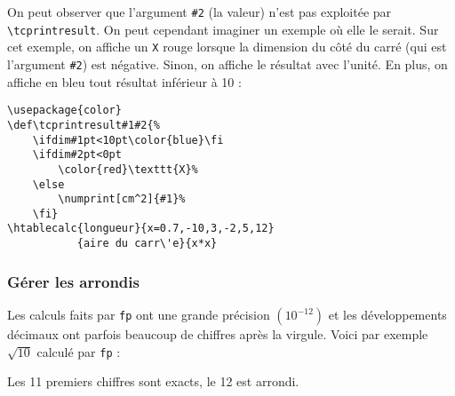 \documentclass[a4paper,10pt]{article}
\newcommand\verbinline{\lstinline[breaklines=false,basicstyle=\normalsize\ttfamily]}
\newcommand\mywidth{0.85\linewidth}
\begin{document}
On peut observer que l'argument \verb|#2| (la valeur) n'est pas exploitée par \verbinline|\tcprintresult|. On peut cependant imaginer un exemple où elle le serait. Sur cet exemple, on affiche un \verb|X| rouge lorsque la dimension du côté du carré (qui est l'argument \verb|#2|) est négative. Sinon, on affiche le résultat avec l'unité. En plus, on affiche en bleu tout résultat inférieur à 10 :\par\nobreak
\begin{center}
\begin{minipage}{\mywidth}
\begin{lstlisting}
\usepackage{color}
\def\tcprintresult#1#2{%
	\ifdim#1pt<10pt\color{blue}\fi
	\ifdim#2pt<0pt
		\color{red}\texttt{X}%
	\else
		\numprint[cm^2]{#1}%
	\fi}
\htablecalc{longueur}{x=0.7,-10,3,-2,5,12}
           {aire du carr\'e}{x*x}
\end{lstlisting}
\end{minipage}

\def\tcprintresult#1#2{%
	\ifdim#1pt<10pt\color{blue}\fi
	\ifdim#2pt<0pt
		\color{red}\texttt{X}%
	\else
		\numprint[cm^2]{#1}%
	\fi}
\end{center}

\subsubsection{Gérer les arrondis}
Les calculs faits par \verb|fp| ont une grande précision $\left(10^{-12}\right)$ et les développements décimaux ont parfois beaucoup de chiffres après la virgule. Voici par exemple $\sqrt{10}$ calculé par \verb=fp= :
\begin{center}\FPeval{}\numprint\truc\end{center}
Les 11 premiers chiffres sont exacts, le 12\ieme{} est arrondi.\medskip
\end{document}
